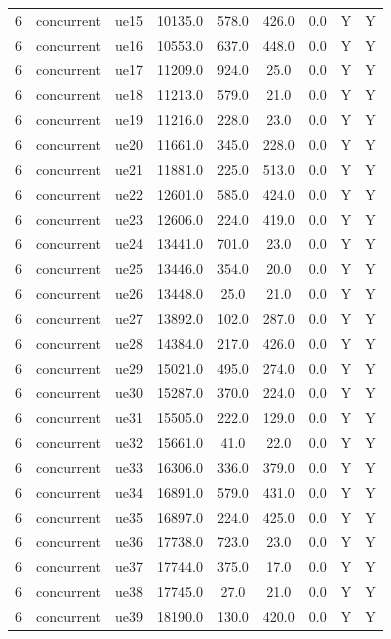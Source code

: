 \begin{table}[ht]
\begin{tabular}{|c|c|c|c|c|c|c|c|c|}
6 & concurrent & ue15 & 10135.0 & 578.0 & 426.0 & 0.0 & Y & Y \\
6 & concurrent & ue16 & 10553.0 & 637.0 & 448.0 & 0.0 & Y & Y \\
6 & concurrent & ue17 & 11209.0 & 924.0 & 25.0 & 0.0 & Y & Y \\
6 & concurrent & ue18 & 11213.0 & 579.0 & 21.0 & 0.0 & Y & Y \\
6 & concurrent & ue19 & 11216.0 & 228.0 & 23.0 & 0.0 & Y & Y \\
6 & concurrent & ue20 & 11661.0 & 345.0 & 228.0 & 0.0 & Y & Y \\
6 & concurrent & ue21 & 11881.0 & 225.0 & 513.0 & 0.0 & Y & Y \\
6 & concurrent & ue22 & 12601.0 & 585.0 & 424.0 & 0.0 & Y & Y \\
6 & concurrent & ue23 & 12606.0 & 224.0 & 419.0 & 0.0 & Y & Y \\
6 & concurrent & ue24 & 13441.0 & 701.0 & 23.0 & 0.0 & Y & Y \\
6 & concurrent & ue25 & 13446.0 & 354.0 & 20.0 & 0.0 & Y & Y \\
6 & concurrent & ue26 & 13448.0 & 25.0 & 21.0 & 0.0 & Y & Y \\
6 & concurrent & ue27 & 13892.0 & 102.0 & 287.0 & 0.0 & Y & Y \\
6 & concurrent & ue28 & 14384.0 & 217.0 & 426.0 & 0.0 & Y & Y \\
6 & concurrent & ue29 & 15021.0 & 495.0 & 274.0 & 0.0 & Y & Y \\
6 & concurrent & ue30 & 15287.0 & 370.0 & 224.0 & 0.0 & Y & Y \\
6 & concurrent & ue31 & 15505.0 & 222.0 & 129.0 & 0.0 & Y & Y \\
6 & concurrent & ue32 & 15661.0 & 41.0 & 22.0 & 0.0 & Y & Y \\
6 & concurrent & ue33 & 16306.0 & 336.0 & 379.0 & 0.0 & Y & Y \\
6 & concurrent & ue34 & 16891.0 & 579.0 & 431.0 & 0.0 & Y & Y \\
6 & concurrent & ue35 & 16897.0 & 224.0 & 425.0 & 0.0 & Y & Y \\
6 & concurrent & ue36 & 17738.0 & 723.0 & 23.0 & 0.0 & Y & Y \\
6 & concurrent & ue37 & 17744.0 & 375.0 & 17.0 & 0.0 & Y & Y \\
6 & concurrent & ue38 & 17745.0 & 27.0 & 21.0 & 0.0 & Y & Y \\
6 & concurrent & ue39 & 18190.0 & 130.0 & 420.0 & 0.0 & Y & Y \\

\end{tabular}
\end{table}
